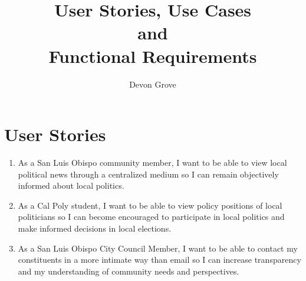 \documentclass{article}
\title{User Stories, Use Cases\\
  {\large and}\\
  Functional Requirements}
\author{Devon Grove}
\newcommand{\story}[3]{\item As a #1, I want to be able to #2 so I can #3.}
\begin{document}
\maketitle
\tableofcontents
\section{User Stories}
\begin{enumerate}
\story{San Luis Obispo community member}{view local political news through a centralized medium}
	{remain objectively informed about local politics}\label{agenda}
\story{Cal Poly student}{view policy positions of local politicians}
	{become encouraged to participate in local politics and make informed decisions in local elections}
\story{San Luis Obispo City Council Member}{contact my constituents in a more intimate way than email}
	{increase transparency and my understanding of community needs and perspectives}
\end{enumerate}
\end{document}
